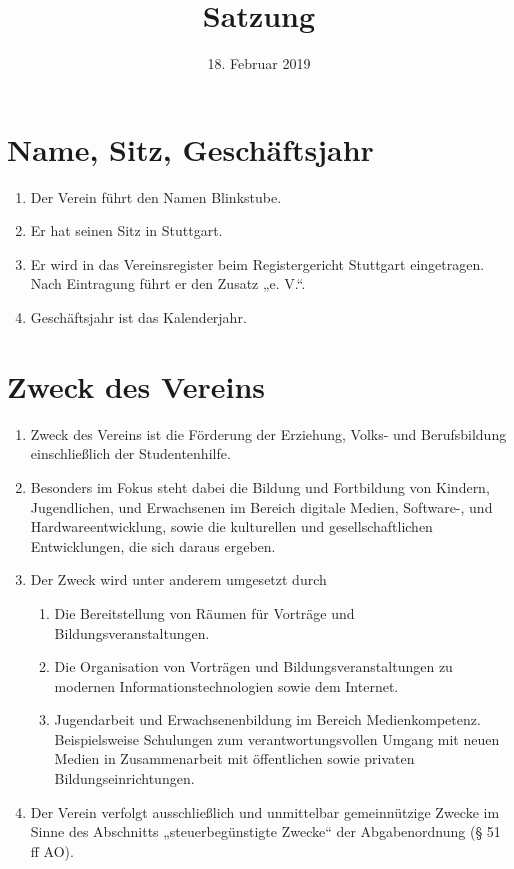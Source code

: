 \documentclass[a4paper, 12pt]{scrartcl}
\title{Satzung}
\subtitle{\verein}
\author{}
\date{18. Februar 2019}
\newcommand\verein{Blinkstube}
\begin{document}
\maketitle
\sffamily

\section{Name, Sitz, Geschäftsjahr}
\begin{enumerate}
  \item Der Verein führt den Namen \verein.
  \item Er hat seinen Sitz in Stuttgart.
  \item Er wird in das Vereinsregister beim Registergericht Stuttgart eingetragen. Nach Eintragung führt er den Zusatz „e. V.“.
  \item Geschäftsjahr ist das Kalenderjahr.
\end{enumerate}

\section{Zweck des Vereins}
\begin{enumerate}
  \item Zweck des Vereins ist die Förderung der Erziehung, Volks- und Berufsbildung einschließlich der Studentenhilfe.
  \item Besonders im Fokus steht dabei die Bildung und Fortbildung von Kindern, Jugendlichen, und Erwachsenen im Bereich digitale Medien, Software-, und Hardwareentwicklung, sowie die kulturellen und gesellschaftlichen Entwicklungen, die sich daraus ergeben.
  \item Der Zweck wird unter anderem umgesetzt durch
  \begin{enumerate}
    \item Die Bereitstellung von Räumen für Vorträge und Bildungsveranstaltungen.
    \item Die Organisation von Vorträgen und Bildungsveranstaltungen zu modernen Informationstechnologien sowie dem Internet.
    \item Jugendarbeit und Erwachsenenbildung im Bereich Medienkompetenz. Beispielsweise Schulungen zum verantwortungsvollen Umgang mit neuen Medien in Zusammenarbeit mit öffentlichen sowie privaten Bildungseinrichtungen.
    \end{enumerate}
  \item Der Verein verfolgt ausschließlich und unmittelbar gemeinnützige Zwecke im Sinne des Abschnitts „steuerbegünstigte Zwecke“ der Abgabenordnung (§ 51 ff AO).
\end{enumerate}
\end{document}
